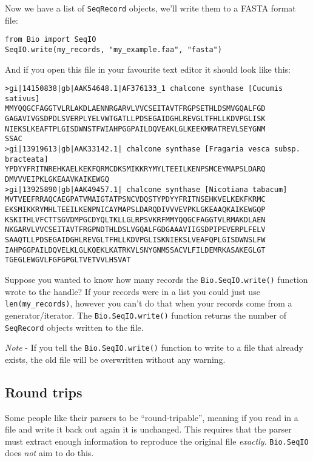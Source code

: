 \noindent Now we have a list of \verb|SeqRecord| objects, we'll write them to a FASTA format file:

\begin{verbatim}
from Bio import SeqIO
SeqIO.write(my_records, "my_example.faa", "fasta")
\end{verbatim}

\noindent And if you open this file in your favourite text editor it should look like this:

\begin{verbatim}
>gi|14150838|gb|AAK54648.1|AF376133_1 chalcone synthase [Cucumis sativus]
MMYQQGCFAGGTVLRLAKDLAENNRGARVLVVCSEITAVTFRGPSETHLDSMVGQALFGD
GAGAVIVGSDPDLSVERPLYELVWTGATLLPDSEGAIDGHLREVGLTFHLLKDVPGLISK
NIEKSLKEAFTPLGISDWNSTFWIAHPGGPAILDQVEAKLGLKEEKMRATREVLSEYGNM
SSAC
>gi|13919613|gb|AAK33142.1| chalcone synthase [Fragaria vesca subsp. bracteata]
YPDYYFRITNREHKAELKEKFQRMCDKSMIKKRYMYLTEEILKENPSMCEYMAPSLDARQ
DMVVVEIPKLGKEAAVKAIKEWGQ
>gi|13925890|gb|AAK49457.1| chalcone synthase [Nicotiana tabacum]
MVTVEEFRRAQCAEGPATVMAIGTATPSNCVDQSTYPDYYFRITNSEHKVELKEKFKRMC
EKSMIKKRYMHLTEEILKENPNICAYMAPSLDARQDIVVVEVPKLGKEAAQKAIKEWGQP
KSKITHLVFCTTSGVDMPGCDYQLTKLLGLRPSVKRFMMYQQGCFAGGTVLRMAKDLAEN
NKGARVLVVCSEITAVTFRGPNDTHLDSLVGQALFGDGAAAVIIGSDPIPEVERPLFELV
SAAQTLLPDSEGAIDGHLREVGLTFHLLKDVPGLISKNIEKSLVEAFQPLGISDWNSLFW
IAHPGGPAILDQVELKLGLKQEKLKATRKVLSNYGNMSSACVLFILDEMRKASAKEGLGT
TGEGLEWGVLFGFGPGLTVETVVLHSVAT
\end{verbatim}

Suppose you wanted to know how many records the \verb|Bio.SeqIO.write()| function wrote to the handle?
If your records were in a list you could just use \verb|len(my_records)|, however you can't do that when your records come from a generator/iterator.  The \verb|Bio.SeqIO.write()| function returns the number of \verb|SeqRecord| objects written to the file.

\emph{Note} - If you tell the \verb|Bio.SeqIO.write()| function to write to a file that already exists, the old file will be overwritten without any warning.

\subsection{Round trips}

Some people like their parsers to be ``round-tripable'', meaning if you read in
a file and write it back out again it is unchanged. This requires that the parser
must extract enough information to reproduce the original file \emph{exactly}.
\verb|Bio.SeqIO| does \emph{not} aim to do this.

